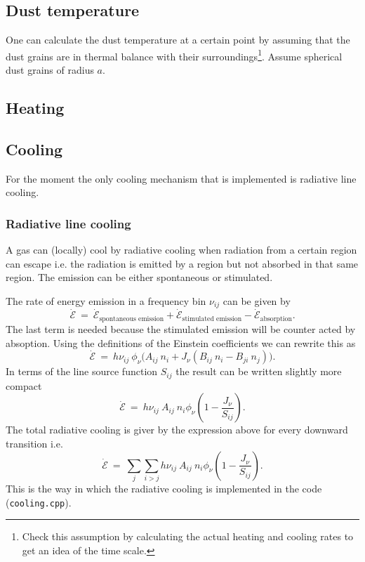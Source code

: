 \documentclass[]{article}
\begin{document}
\subsection{Dust temperature}

One can calculate the dust temperature at a certain point by assuming that the dust grains are in thermal balance with their surroundings\footnote{Check this assumption by calculating the actual heating and cooling rates to get an idea of the time scale.}. Assume spherical dust grains of radius $a$.


\subsection{Heating}



\subsection{Cooling}

For the moment the only cooling mechanism that is implemented is radiative line cooling.

\subsubsection{Radiative line cooling}

A gas can (locally) cool by radiative cooling when radiation from a certain region can escape i.e. the radiation is emitted by a region but not absorbed in that same region. The emission can be either spontaneous or stimulated.

\bigskip

The rate of energy emission in a frequency bin $\nu_{ij}$ can be given by
\begin{equation}
\dot{\mathcal{E}} \ = \ \dot{\mathcal{E}}_{\text{spontaneous emission}} + \dot{\mathcal{E}}_{\text{stimulated emission}} - \dot{\mathcal{E}}_{\text{absorption}} .
\end{equation}
The last term is needed because the stimulated emission will be counter acted by absoption. Using the definitions of the Einstein coefficients we can rewrite this as
\begin{equation}
\dot{\mathcal{E}} \ = \ h\nu_{ij} \ \phi_{\nu} \Big( A_{ij} \ n_{i}  + J_{\nu} \left( B_{ij} \ n_{i} - B_{ji} \ n_{j} \right) \Big).
\end{equation}
In terms of the line source function $S_{ij}$ the result can be written slightly more compact
\begin{equation}
\dot{\mathcal{E}} \ = \ h\nu_{ij} \ A_{ij} \ n_{i}  \phi_{\nu} \left( 1  - \frac{J_{\nu}}{S_{ij}} \right).
\end{equation}
The total radiative cooling is giver by the expression above for every downward transition i.e.
\begin{equation}
\dot{\mathcal{E}} \ = \ \sum_{j} \sum_{i>j} h\nu_{ij} \ A_{ij} \ n_{i}  \phi_{\nu} \left( 1  - \frac{J_{\nu}}{S_{ij}} \right).
\end{equation}
This is the way in which the radiative cooling is implemented in the code (\texttt{cooling.cpp}).


\newpage



\end{document}
